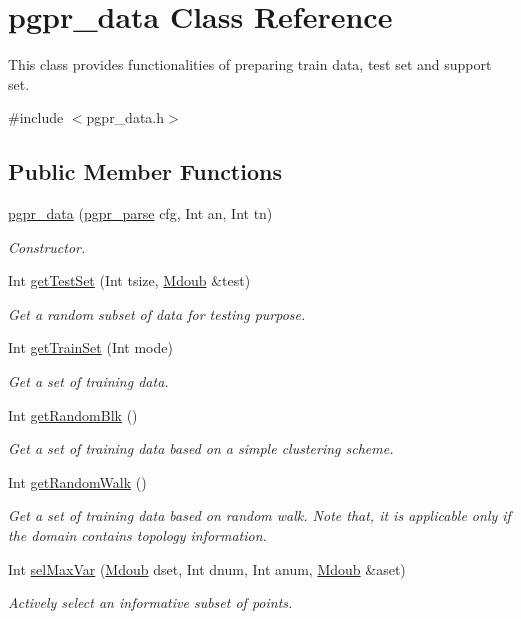 \hypertarget{classpgpr__data}{\section{pgpr\+\_\+data Class Reference}
\label{classpgpr__data}
}


This class provides functionalities of preparing train data, test set and support set.  




{\ttfamily \#include $<$pgpr\+\_\+data.\+h$>$}

\subsection*{Public Member Functions}
\begin{DoxyCompactItemize}
\item 
\hyperlink{classpgpr__data_aa6879cea28bfba9c8a3fbd87df02a92c}{pgpr\+\_\+data} (\hyperlink{classpgpr__parse}{pgpr\+\_\+parse} cfg, Int an, Int tn)
\begin{DoxyCompactList}\small\item\em Constructor. \end{DoxyCompactList}\item 
Int \hyperlink{classpgpr__data_accb6162698eefa8c8826205a21ad18ab}{get\+Test\+Set} (Int tsize, \hyperlink{classpgpr__matrix}{Mdoub} \&test)
\begin{DoxyCompactList}\small\item\em Get a random subset of data for testing purpose. \end{DoxyCompactList}\item 
Int \hyperlink{classpgpr__data_aa826857a19458c7ec5dde1b9109f3b07}{get\+Train\+Set} (Int mode)
\begin{DoxyCompactList}\small\item\em Get a set of training data. \end{DoxyCompactList}\item 
Int \hyperlink{classpgpr__data_a569dc41fa124c739d28d05d56874d4c4}{get\+Random\+Blk} ()
\begin{DoxyCompactList}\small\item\em Get a set of training data based on a simple clustering scheme. \end{DoxyCompactList}\item 
Int \hyperlink{classpgpr__data_a1b0b0b000a221c160339ea4207910753}{get\+Random\+Walk} ()
\begin{DoxyCompactList}\small\item\em Get a set of training data based on random walk. Note that, it is applicable only if the domain contains topology information. \end{DoxyCompactList}\item 
Int \hyperlink{classpgpr__data_accef69857141cfa9e7b415edab6e2899}{sel\+Max\+Var} (\hyperlink{classpgpr__matrix}{Mdoub} dset, Int dnum, Int anum, \hyperlink{classpgpr__matrix}{Mdoub} \&aset)
\begin{DoxyCompactList}\small\item\em Actively select an informative subset of points. \end{DoxyCompactList}\end{DoxyCompactItemize}
